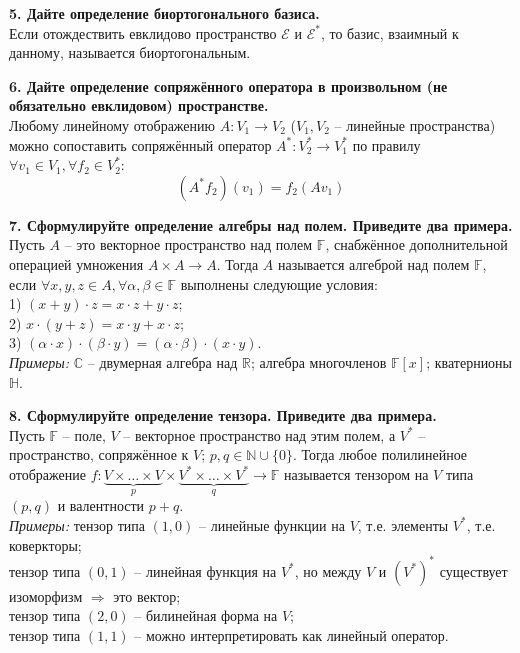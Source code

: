 \documentclass[11pt,a4paper]{article}
\renewcommand{\C}{\mathbb{C}}
\newcommand{\R}{\mathbb{R}}
\newcommand{\F}{\mathbb{F}}
\begin{document}
\textbf{5. Дайте определение биортогонального базиса.\\}
Если отождествить евклидово пространство $\mathcal{E}$ и $\mathcal{E}^*$, то базис, взаимный к данному, называется биортогональным.

\textbf{6. Дайте определение сопряжённого оператора в произвольном (не обязательно евклидовом) пространстве.\\}
Любому линейному отображению $A : V_1 \rightarrow V_2$ ($V_1, V_2$ -- линейные пространства) можно сопоставить сопряжённый оператор $A^* : V_2^*\rightarrow V_1^*$ по правилу $\forall v_1 \in V_1, \forall f_2 \in V_2^*$: $$(A^* f_2)(v_1) = f_2 (A v_1)$$

\textbf{7. Сформулируйте определение алгебры над полем. Приведите два примера.\\}
Пусть $A$ -- это векторное пространство над полем $\F$, снабжённое дополнительной операцией умножения $A \times A \rightarrow A$. Тогда $A$ называется алгеброй над полем $\F$, если $\forall x, y, z \in A, \forall \alpha, \beta \in \F$ выполнены следующие условия:\\
1) $(x + y) \cdot z = x \cdot z + y \cdot z$;\\
2) $x \cdot (y + z) = x \cdot y + x \cdot z$;\\
3) $(\alpha \cdot x) \cdot (\beta \cdot y) = (\alpha \cdot \beta) \cdot (x \cdot y)$.\\
\textit{Примеры:} $\C$ -- двумерная алгебра над $\R$; алгебра многочленов $\F [x]$; кватернионы $\mathbb{H}$.

\textbf{8. Сформулируйте определение тензора. Приведите два примера.\\}
Пусть $\F$ -- поле, $V$ -- векторное пространство над этим полем, а $V^*$ -- пространство, сопряжённое к $V$; $p, q \in \mathbb{N} \cup \{ 0 \}$. Тогда любое полилинейное отображение $f: \underbrace{ V \times \dots \times V }_{p} \times \underbrace{ V^* \times \dots \times V^* }_{q} \rightarrow \F$ называется тензором на $V$ типа $(p, q)$ и валентности $p + q$.\\
\textit{Примеры:} тензор типа $(1, 0)$ -- линейные функции на $V$, т.е. элементы $V^*$, т.е. коверкторы;\\
тензор типа $(0, 1)$ -- линейная функция на $V^*$, но между $V$ и $(V^*)^*$ существует изоморфизм $\Rightarrow$ это вектор;\\
тензор типа $(2, 0)$ -- билинейная форма на $V$;\\
тензор типа $(1, 1)$ -- можно интерпретировать как линейный оператор.
\end{document}
